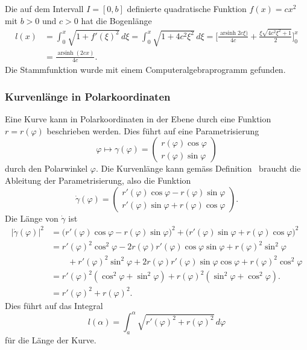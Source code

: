 \begin{beispiel}
Die auf dem Intervall $I=[0,b]$ definierte quadratische Funktion $f(x)=cx^2$
mit $b>0$ und $c>0$ hat die Bogenlänge
\begin{align*}
l(x)
&=
\int_0^x \sqrt{1+f'(\xi)^2}\,d\xi
=
\int_0^x \sqrt{1+4c^2\xi^2}\,d\xi
=
\biggl[
\frac{ \operatorname{arsinh}2c\xi)}{4c} + \frac{\xi\sqrt{4c^2\xi^2+1}}{2}
\biggr]_0^x
\\
&=
\frac{ \operatorname{arsinh}(2cx)}{4c}.
\end{align*}
Die Stammfunktion wurde mit einem Computeralgebraprogramm gefunden.
\end{beispiel}

\subsubsection{Kurvenlänge in Polarkoordinaten}
Eine Kurve kann in Polarkoordinaten in der Ebene durch eine Funktion
$r=r(\varphi)$ beschrieben werden.
Dies führt auf eine Parametrisierung
\[
\varphi \mapsto \gamma(\varphi)=\begin{pmatrix}
r(\varphi)\cos\varphi\\
r(\varphi)\sin\varphi
\end{pmatrix}
\]
durch den Polarwinkel $\varphi$.
Die Kurvenlänge kann gemäss 
Definition~\label{buch:geometrie:def:kurvenlaenge} braucht
die Ableitung der Parametrisierung, also die Funktion
\[
\dot{\gamma}(\varphi)
=
\begin{pmatrix}
r'(\varphi)\cos\varphi - r(\varphi)\sin\varphi\\
r'(\varphi)\sin\varphi + r(\varphi)\cos\varphi
\end{pmatrix}.
\]
Die Länge von $\dot{\gamma}$ ist
\begin{align*}
|\dot{\gamma}(\varphi)|^2
&=
\bigl(
r'(\varphi)\cos\varphi - r(\varphi)\sin\varphi
\bigr)^2
+
\bigl(
r'(\varphi)\sin\varphi + r(\varphi)\cos\varphi
\bigr)^2
\\
&=
r'(\varphi)^2\cos^2\varphi
-2r(\varphi)r'(\varphi)\cos\varphi\sin\varphi
+r(\varphi)^2\sin^2\varphi
\\
&\qquad
+r'(\varphi)^2\sin^2\varphi
+2r(\varphi)r'(\varphi)\sin\varphi\cos\varphi
+r(\varphi)^2\cos^2\varphi
\\
&=r'(\varphi)^2(\cos^2\varphi+\sin^2\varphi)
+ r(\varphi)^2(\sin^2\varphi+\cos^2\varphi).
\\
&=
r'(\varphi)^2 + r(\varphi)^2.
\end{align*}
Dies führt auf das
Integral
\begin{equation}
l(\alpha)
=
\int_a^\alpha \sqrt{r'(\varphi)^2 + r(\varphi)^2}\,d\varphi
\end{equation}
für die Länge der Kurve.

